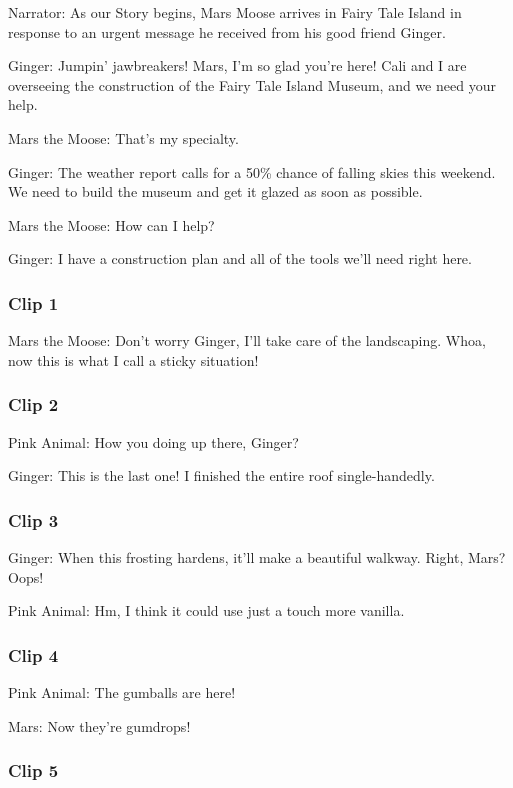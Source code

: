 Narrator: As our Story begins, Mars Moose arrives in Fairy Tale Island in response to an urgent message he received from his good friend Ginger.

Ginger: Jumpin' jawbreakers! Mars, I'm so glad you're here! Cali and I are overseeing the construction of the Fairy Tale Island Museum, and we need your help.

Mars the Moose: That's my specialty.

Ginger: The weather report calls for a 50\% chance of falling skies this weekend. We need to build the museum and get it glazed as soon as possible.

Mars the Moose: How can I help?

Ginger: I have a construction plan and all of the tools we'll need right here.

\subsubsection{Clip 1}

Mars the Moose: Don't worry Ginger, I'll take care of the landscaping. Whoa, now this is what I call a sticky situation!

\subsubsection{Clip 2}

Pink Animal: How you doing up there, Ginger?

Ginger: This is the last one! I finished the entire roof single-handedly.

\subsubsection{Clip 3}

Ginger: When this frosting hardens, it'll make a beautiful walkway. Right, Mars? Oops!

Pink Animal: Hm, I think it could use just a touch more vanilla.

\subsubsection{Clip 4}

Pink Animal: The gumballs are here!

Mars: Now they're gumdrops!

\subsubsection{Clip 5}

